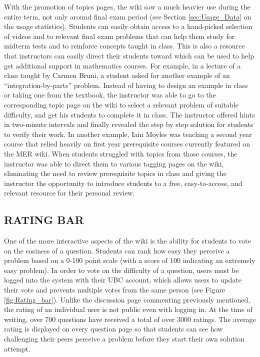 \documentclass{primus}
\begin{document}
\noindent{}With the promotion of topics pages, the wiki saw a much heavier use during the entire term, not only around final exam period (see Section \ref{sec:Usage_Data} on the usage statistics). Students can easily obtain access to a hand-picked selection of videos and to relevant final exam problems that can help them study for midterm tests and to reinforce concepts taught in class. This is also a resource that instructors can easily direct their students toward which can be used to help get additional support in mathematics courses. For example, in a lecture of a class taught by Carmen Bruni, a student asked for another example of an ``integration-by-parts'' problem. Instead of having to design an example in class or taking one from the textbook, the instructor was able to go to the corresponding topic page on the wiki to select a relevant problem of suitable difficulty, and get his students to complete it in class. The instructor offered hints in two-minute intervals and finally revealed the step by step solution for students to verify their work. In another example, Iain Moyles was teaching a second year course that relied heavily on first year prerequisite courses currently featured on the MER wiki. When students struggled with topics from those courses, the instructor was able to direct them to various tagging pages on the wiki, eliminating the need to review prerequisite topics in class and giving the instructor the opportunity to introduce students to a free, easy-to-access, and relevant resource for their personal review.

\subsection{RATING BAR}\label{sec:Rating_Bar}
One of the more interactive aspects of the wiki is the ability for students to vote on the easiness of a question. Students can rank how easy they perceive a problem based on a 0-100 point scale (with a score of 100 indicating an extremely easy problem). In order to vote on the difficulty of a question, users must be logged into the system with their UBC account, which allows users to update their vote and prevents multiple votes from the same person (see Figure \ref{fig:Rating_bar}). Unlike the discussion page commenting previously mentioned, the rating of an individual user is not public even with logging in. At the time of writing, over 700 questions have received a total of over 3000 ratings. The average rating is displayed on every question page so that students can see how challenging their peers perceive a problem before they start their own solution attempt.
\end{document}
